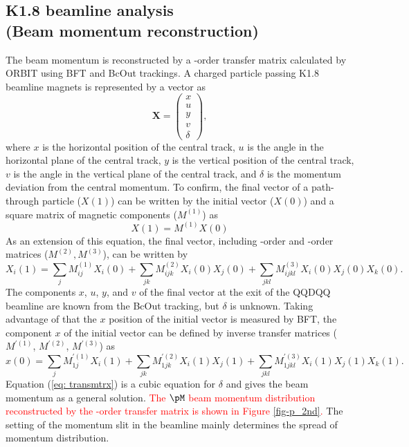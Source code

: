 \subsection{K1.8 beamline analysis\\(Beam momentum reconstruction)}
The beam momentum is reconstructed by a -order transfer matrix calculated by ORBIT using BFT and BcOut trackings. A charged particle passing K1.8 beamline magnets is represented by a vector as 
\begin{equation}
  \bm{X} = 
\begin{pmatrix}
 x  \\
 u  \\
 y  \\
 v  \\
 \delta   
\end{pmatrix},
\end{equation}
where $x$ is the horizontal position of the central track, $u$ is the angle in the horizontal plane of the central track, $y$ is the vertical position of the central track, $v$ is the angle in the vertical plane of the central track, and $\delta$ is the momentum deviation from the central momentum. To confirm, the final vector of a path-through particle ($X(1)$) can be written by the initial vector ($X(0)$) and a square matrix of magnetic components ($M^{(1)}$) as
\begin{equation}
  X(1) = M^{(1)} X(0)
\end{equation}
As an extension of this equation, the final vector, including -order and -order matrices ($M^{(2)}, M^{(3)}$), can be written by
\begin{equation}
  X_{i}(1) = \sum_{j} M_{ij}^{(1)} X_{i}(0) + \sum_{jk} M_{ijk}^{(2)} X_{i}(0)X_{j}(0) + \sum_{jkl} M_{ijkl}^{(3)} X_{i}(0)X_{j}(0)X_{k}(0).
\end{equation}
The components $x$, $u$, $y$, and $v$ of the final vector at the exit of the QQDQQ beamline are known from the BcOut tracking, but $\delta$ is unknown. Taking advantage of that the $x$ position of the initial vector is measured by BFT, the component $x$ of the initial vector can be defined by inverse transfer matrices ($M^{'(1)}$, $M^{'(2)}$, $M^{'(3)}$) as
\begin{equation}
  x(0) = \sum_{j} M_{1j}^{'(1)} X_{i}(1) + \sum_{jk} M_{1jk}^{'(2)} X_{i}(1)X_{j}(1) + \sum_{jkl} M_{1jkl}^{'(3)} X_{i}(1)X_{j}(1)X_{k}(1).
  \label{eq: transmtrx}
\end{equation}
Equation (\ref{eq: transmtrx}) is a cubic equation for $\delta$ and gives the beam momentum as a general solution. \textcolor{red}{ The $\pM$ beam momentum distribution reconstructed by the -order transfer matrix is shown in Figure \ref{fig-p_2nd}.} The setting of the momentum slit in the beamline mainly determines the spread of momentum distribution.

